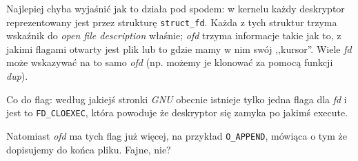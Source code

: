 Najlepiej chyba wyjaśnić jak to działa pod spodem: w kernelu każdy deskryptor reprezentowany jest przez strukturę \texttt{struct\_fd}. Każda z tych struktur trzyma wskaźnik do \textit{open file description} właśnie; \textit{ofd} trzyma informacje takie jak to, z jakimi flagami otwarty jest plik lub to gdzie mamy w nim swój ,,kursor''. Wiele \textit{fd} może wskazywać na to samo \textit{ofd} (np. możemy je klonować za pomocą funkcji \textit{dup}). 

Co do flag: według jakiejś stronki \textit{GNU} obecnie istnieje tylko jedna flaga dla \textit{fd} i jest to \texttt{FD\_CLOEXEC}, która powoduje że deskryptor się zamyka po jakimś execute.

Natomiast \textit{ofd} ma tych flag już więcej, na przykład \texttt{O\_APPEND}, mówiąca o tym że dopisujemy do końca pliku. Fajne, nie?